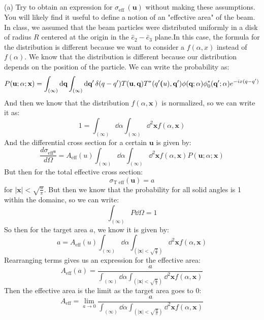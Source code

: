 \documentclass[12pt]{article}
\begin{document}
\subsection{}
(a) Try to obtain an expression for $\sigma_{\text {eff }}(\mathbf{u})$ without making these assumptions. You will likely find it useful to define a notion of an "effective area" of the beam.\\
In class, we assumed that the beam particles were distributed uniformly in a disk of radius $R$ centered at the origin in the $\hat{e}_{2}-\hat{e}_{3}$ plane.In this case, the formula for the distribution is different because we want to consider a $f(\alpha , x)$ instead of $f(\alpha )$. We know that the distribution is different because our distribution depends on the position of the particle. We can write the probability as:
\begin{equation}
P(\textbf{u} ; \alpha ; \mathbf{x}) = \int_{(\infty)} \dd{\textbf{q}}\int_{(\infty)} \dd{\textbf{q}^{\prime}} \delta(q-q^{\prime}) T(\textbf{u}   , \textbf{q})T^*(q^{\prime}\textbf(u), \textbf{q}^{\prime}) \phi(\textbf{q}; \alpha) \phi_0^*(\textbf{q}^{\prime}; \alpha) e^{-ix(q-q^{\prime})}
\end{equation}
And then we know that the distribution $f(\alpha, \textbf{x})$ is normalized, so we can write it as:
\begin{equation}
1 = \int_{(\infty)} \dd{\alpha} \int_{(\infty)} \dd^2{\textbf{x}} f(\alpha, \textbf{x})
\end{equation}
And the differential cross section for a certain $\textbf{u}$ is given by:
\begin{equation}
\frac{d\sigma_{\text{eff}^{\textbf{u}}}}{d\Omega} = A_{\text{eff}}(u) \int_{(\infty)} \dd{\alpha} \int_{(\infty)} \dd^2{\textbf{x}} f(\alpha, \textbf{x}) P(\textbf{u} ; \alpha ; \mathbf{x})
\end{equation}
But then for the total effective cross section:
\begin{equation}
\sigma_{\text{T eff}}(\textbf{u}) = a
\end{equation}
for $|\textbf{x}| < \sqrt{\frac{a}{\pi}}$. But then we know that the probability for all solid angles is 1 within the domainc, so we can write:
\begin{equation}
\int_{(\infty)} P \dd{\Omega} = 1
\end{equation}
So then for the target area $a$, we know it is given by:
\begin{equation}
a = A_{\text{eff}}(u) \int_{(\infty)} \dd{\alpha} \int_{(|\textbf{x}| < \sqrt{\frac{a}{\pi}})} \dd^2{\textbf{x}} f(\alpha, \textbf{x})
\end{equation}
Rearranging terms gives us an expression for the effective area:
\begin{equation}
A_{\text{eff}}(a) = \frac{a}{\int_{(\infty)} \dd{\alpha} \int_{(|\textbf{x}| < \sqrt{\frac{a}{\pi}})} \dd^2{\textbf{x}} f(\alpha, \textbf{x})}
\end{equation}
Then the effective area is the limit as the target area goes to 0:
\begin{equation}
A_{\text{eff}} = \lim_{a \to 0} \frac{a}{\int_{(\infty)} \dd{\alpha} \int_{(|\textbf{x}| < \sqrt{\frac{a}{\pi}})} \dd^2{\textbf{x}} f(\alpha, \textbf{x})}
\end{equation}
\end{document}
